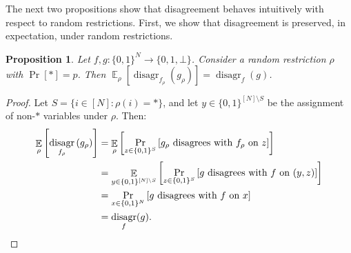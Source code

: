 \documentclass[11pt]{article}%
\newtheorem{proposition}[theorem]{Proposition}
\newcommand{\E}{\mathop{\mathbb{E}}}
\DeclareMathOperator{\disagr}{\mathrm{disagr}}
\begin{document}
The next two propositions show that disagreement behaves intuitively with respect to random restrictions. First, we show that disagreement is preserved, in expectation, under random restrictions.
\begin{proposition}
\label{prop:disagr_random_equal}
Let $f, g: \{0,1\}^N \to \{0,1,\bot\}$. Consider a random restriction $\rho$ with $\Pr[*] = p$. Then $\E_\rho\left[\disagr_{f_\rho}\left(g_\rho\right)\right] = \disagr_f(g)$.
\end{proposition}
\begin{proof}
Let $S = \{i \in [N]: \rho(i) = *\}$, and let $y \in \{0,1\}^{[N] \setminus S}$ be the assignment of non-$*$ variables under $\rho$. Then:
\begin{align*}
\E_\rho\left[\disagr_{f_\rho}\left(g_\rho\right)\right] &= \E_\rho\left[\Pr_{z \in \{0,1\}^S} \left[  g_\rho \text{ \rm disagrees with } f_\rho \text{ \rm on } z \right] \right]\\
&= \E_{y \in \{0,1\}^{[N] \setminus S}}\left[\Pr_{z \in \{0,1\}^S} \left[  g \text{ \rm disagrees with } f \text{ \rm on } (y, z) \right] \right]\\
&= \Pr_{x \in \{0,1\}^{N}}\left[g \text{ \rm disagrees with } f \text{ \rm on } x \right]\\
&= \disagr_f(g).\qedhere
\end{align*}
\end{proof}
\end{document}
